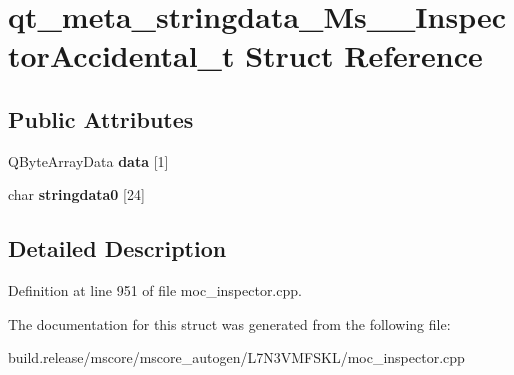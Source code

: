 \hypertarget{structqt__meta__stringdata___ms_____inspector_accidental__t}{}\section{qt\+\_\+meta\+\_\+stringdata\+\_\+\+Ms\+\_\+\+\_\+\+Inspector\+Accidental\+\_\+t Struct Reference}
\label{structqt__meta__stringdata___ms_____inspector_accidental__t}
\subsection*{Public Attributes}
\begin{DoxyCompactItemize}
\item 
\mbox{\label{structqt__meta__stringdata___ms_____inspector_accidental__t_aadef58946653980e0f5200ad572dc368}} 
Q\+Byte\+Array\+Data {\bfseries data} \mbox{[}1\mbox{]}
\item 
\mbox{\label{structqt__meta__stringdata___ms_____inspector_accidental__t_af7f97d1c8f97179ef31c86bd0f0f073a}} 
char {\bfseries stringdata0} \mbox{[}24\mbox{]}
\end{DoxyCompactItemize}


\subsection{Detailed Description}


Definition at line 951 of file moc\+\_\+inspector.\+cpp.



The documentation for this struct was generated from the following file\+:\begin{DoxyCompactItemize}
\item 
build.\+release/mscore/mscore\+\_\+autogen/\+L7\+N3\+V\+M\+F\+S\+K\+L/moc\+\_\+inspector.\+cpp\end{DoxyCompactItemize}
